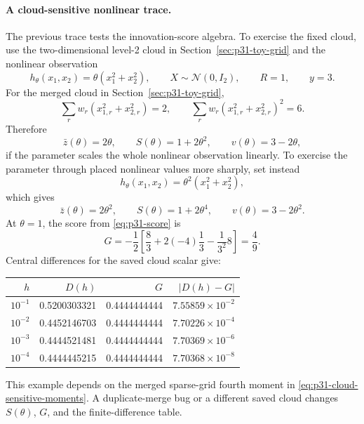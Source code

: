 \documentclass[11pt]{article}
\numberwithin{equation}{section}
\newcommand{\N}{\mathcal N}
\begin{document}
\paragraph{A cloud-sensitive nonlinear trace.}
The previous trace tests the innovation-score algebra.  To exercise the fixed
cloud, use the two-dimensional level-2 cloud in Section~\ref{sec:p31-toy-grid}
and the nonlinear observation
\begin{equation}
  h_\theta(x_1,x_2)=\theta(x_1^2+x_2^2),
  \qquad
  X\sim\N(0,I_2),\qquad R=1,\qquad y=3.
  \label{eq:p31-cloud-sensitive-model}
\end{equation}
For the merged cloud in Section~\ref{sec:p31-toy-grid},
\begin{equation}
  \sum_r w_r(x_{1,r}^2+x_{2,r}^2)=2,
  \qquad
  \sum_r w_r(x_{1,r}^2+x_{2,r}^2)^2=6.
  \label{eq:p31-cloud-sensitive-moments}
\end{equation}
Therefore
\begin{equation}
  \bar z(\theta)=2\theta,\qquad
  S(\theta)=1+2\theta^2,\qquad
  v(\theta)=3-2\theta,
  \label{eq:p31-cloud-sensitive-likelihood-objects}
\end{equation}
if the parameter scales the whole nonlinear observation linearly.  To exercise
the parameter through placed nonlinear values more sharply, set instead
\begin{equation}
  h_\theta(x_1,x_2)=\theta^2(x_1^2+x_2^2),
  \label{eq:p31-cloud-sensitive-square-param}
\end{equation}
which gives
\begin{equation}
  \bar z(\theta)=2\theta^2,\qquad
  S(\theta)=1+2\theta^4,\qquad
  v(\theta)=3-2\theta^2.
  \label{eq:p31-cloud-sensitive-square-objects}
\end{equation}
At \(\theta=1\), the score from \eqref{eq:p31-score} is
\begin{equation}
  G
  =
  -\frac12
  \left[
    \frac{8}{3}
    +2(-4)\frac{1}{3}
    -\frac{1}{3^2}8
  \right]
  =
  \frac49.
  \label{eq:p31-cloud-sensitive-score}
\end{equation}
Central differences for the saved cloud scalar give:
\begin{center}
\begin{tabular}{rrrr}
\toprule
\(h\) & \(D(h)\) & \(G\) & \(|D(h)-G|\) \\
\midrule
\(10^{-1}\) & 0.5200303321 & 0.4444444444 & \(7.55859\times10^{-2}\) \\
\(10^{-2}\) & 0.4452146703 & 0.4444444444 & \(7.70226\times10^{-4}\) \\
\(10^{-3}\) & 0.4444521481 & 0.4444444444 & \(7.70369\times10^{-6}\) \\
\(10^{-4}\) & 0.4444445215 & 0.4444444444 & \(7.70368\times10^{-8}\) \\
\bottomrule
\end{tabular}
\end{center}
This example depends on the merged sparse-grid fourth moment in
\eqref{eq:p31-cloud-sensitive-moments}.  A duplicate-merge bug or a different
saved cloud changes \(S(\theta)\), \(G\), and the finite-difference table.
\end{document}
